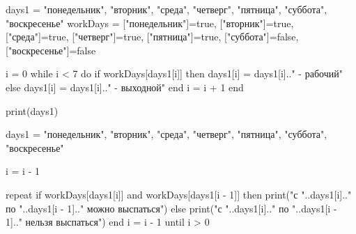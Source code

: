 days1 = {"понедельник", "вторник", "среда", "четверг", "пятница", "суббота", "воскресенье"}
workDays = {["понедельник"]=true, ["вторник"]=true, ["среда"]=true, ["четверг"]=true, ["пятница"]=true, ["суббота"]=false, ["воскресенье"]=false}

i = 0
while i < 7 do
    if workDays[days1[i]] then
        days1[i] = days1[i].." - рабочий"
    else
        days1[i] = days1[i].." - выходной"
    end
    i = i + 1
end

print(days1)

days1 = {"понедельник", "вторник", "среда", "четверг", "пятница", "суббота", "воскресенье"}

i = i - 1

repeat
    if workDays[days1[i]] and workDays[days1[i - 1]] then
        print("с "..days1[i].." по "..days1[i - 1].." можно выспаться")
    else
        print("с "..days1[i].." по "..days1[i - 1].." нельзя выспаться")
    end
    i = i - 1
until i > 0